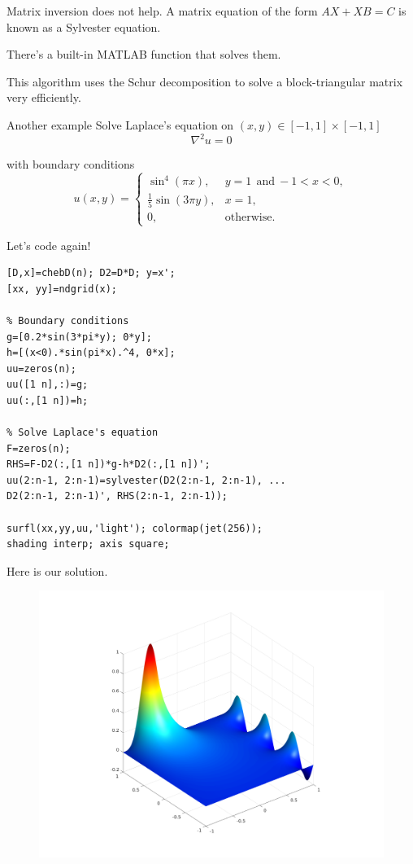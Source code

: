 \documentclass{beamer}
\begin{document}
\begin{frame}{Matrix inversion does not help.}{}
A matrix equation of the form $AX+XB=C$ is known as a Sylvester equation.

\bigskip
There's a built-in MATLAB function that solves them.

\bigskip
{}

\bigskip
This algorithm uses the Schur decomposition to solve a block-triangular matrix very efficiently. 
\end{frame}

\begin{frame}{Another example}{}
Solve Laplace's equation on $(x,y)\in[-1,1]\times[-1,1]$
\begin{equation*}
\nabla^2 u=0
\end{equation*}

with boundary conditions 
\begin{equation*}
u(x,y)=\begin{cases}
\sin^4(\pi x), & y=1 ~~\text{and}~ -1<x<0,\\
\frac{1}{5}\sin(3\pi y), & x=1,\\
0, & \text{otherwise}.
\end{cases}
\end{equation*}
\end{frame}

\begin{frame}[fragile]{Let's code again!}{}
\begin{lstlisting}
[D,x]=chebD(n); D2=D*D; y=x';
[xx, yy]=ndgrid(x);

% Boundary conditions
g=[0.2*sin(3*pi*y); 0*y];
h=[(x<0).*sin(pi*x).^4, 0*x];
uu=zeros(n);
uu([1 n],:)=g;
uu(:,[1 n])=h;

% Solve Laplace's equation
F=zeros(n);
RHS=F-D2(:,[1 n])*g-h*D2(:,[1 n])';
uu(2:n-1, 2:n-1)=sylvester(D2(2:n-1, 2:n-1), ...
D2(2:n-1, 2:n-1)', RHS(2:n-1, 2:n-1));

surfl(xx,yy,uu,'light'); colormap(jet(256));
shading interp; axis square;
\end{lstlisting}
\end{frame}

\begin{frame}{Here is our solution.}{}
\begin{figure}
\centering
\includegraphics[width=\linewidth]{Figures/Laplace2D}
\label{fig:Laplace2D}
\end{figure}
\end{frame}
\end{document}
